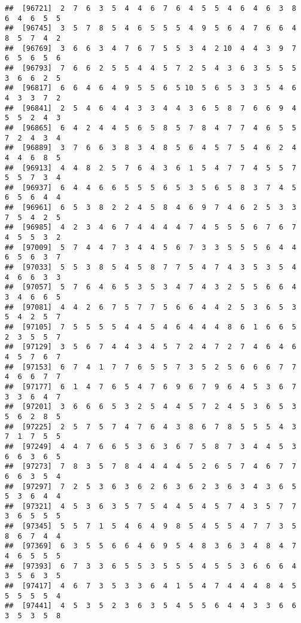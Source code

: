 \documentclass[
]{book}
\begin{document}
\begin{verbatim}
##  [96721]  2  7  6  3  5  4  4  6  7  6  4  5  5  4  6  4  6  3  8  6  4  6  5  5
##  [96745]  3  5  7  8  5  4  6  5  5  5  4  9  5  6  4  7  6  6  4  8  5  7  4  2
##  [96769]  3  6  6  3  4  7  6  7  5  5  3  4  2 10  4  4  3  9  7  6  5  6  5  6
##  [96793]  7  6  6  2  5  5  4  4  5  7  2  5  4  3  6  3  5  5  5  3  6  6  2  5
##  [96817]  6  6  4  6  4  9  5  5  6  5 10  5  6  5  3  3  5  4  6  4  3  3  7  2
##  [96841]  2  5  4  6  4  4  3  3  4  4  3  6  5  8  7  6  6  9  4  5  5  2  4  3
##  [96865]  6  4  2  4  4  5  6  5  8  5  7  8  4  7  7  4  6  5  5  7  2  4  3  4
##  [96889]  3  7  6  6  3  8  3  4  8  5  6  4  5  7  5  4  6  2  4  4  4  6  8  5
##  [96913]  4  4  8  2  5  7  6  4  3  6  1  5  4  7  7  4  5  5  7  5  5  7  3  4
##  [96937]  6  4  4  6  6  5  5  5  6  5  3  5  6  5  8  3  7  4  5  6  5  6  4  4
##  [96961]  6  5  3  8  2  2  4  5  8  4  6  9  7  4  6  2  5  3  3  7  5  4  2  5
##  [96985]  4  2  3  4  6  7  4  4  4  4  7  4  5  5  5  6  7  6  7  4  5  5  3  2
##  [97009]  5  7  4  4  7  3  4  4  5  6  7  3  3  5  5  5  6  4  4  6  5  6  3  7
##  [97033]  5  5  3  8  5  4  5  8  7  7  5  4  7  4  3  5  3  5  4  4  6  6  3  3
##  [97057]  5  7  6  4  6  5  3  5  3  4  7  4  3  2  5  5  6  6  4  3  4  6  6  5
##  [97081]  4  4  2  6  7  5  7  7  5  6  6  4  4  2  5  3  6  5  3  5  4  2  5  7
##  [97105]  7  5  5  5  5  4  4  5  4  6  4  4  4  8  6  1  6  6  5  2  3  5  5  7
##  [97129]  3  5  6  7  4  4  3  4  5  7  2  4  7  2  7  4  6  4  6  4  5  7  6  7
##  [97153]  6  7  4  1  7  7  6  5  5  7  3  5  2  5  6  6  6  7  7  4  6  6  7  7
##  [97177]  6  1  4  7  6  5  4  7  6  9  6  7  9  6  4  5  3  6  7  3  3  6  4  7
##  [97201]  3  6  6  6  5  3  2  5  4  4  5  7  2  4  5  3  6  5  3  5  6  2  8  5
##  [97225]  2  5  7  5  7  4  7  6  4  3  8  6  7  8  5  5  5  4  3  7  1  7  5  5
##  [97249]  4  4  7  6  6  5  3  6  3  6  7  5  8  7  3  4  4  5  3  6  6  3  6  5
##  [97273]  7  8  3  5  7  8  4  4  4  4  5  2  6  5  7  4  6  7  7  6  6  3  5  4
##  [97297]  7  2  5  3  6  3  6  2  6  3  6  2  3  6  3  4  3  6  5  5  3  6  4  4
##  [97321]  4  5  3  6  3  5  7  5  4  4  5  4  5  7  4  3  5  7  7  3  6  5  5  5
##  [97345]  5  5  7  1  5  4  6  4  9  8  5  4  5  5  4  7  7  3  5  8  6  7  4  4
##  [97369]  6  3  5  5  6  6  4  6  9  5  4  8  3  6  3  4  8  4  7  4  6  5  5  5
##  [97393]  6  7  3  3  6  5  5  3  5  5  5  4  5  5  3  6  6  6  4  3  5  6  3  5
##  [97417]  4  6  7  3  5  3  3  6  4  1  5  4  7  4  4  4  8  4  5  5  5  5  5  4
##  [97441]  4  5  3  5  2  3  6  3  5  4  5  5  6  4  4  3  3  6  6  3  5  3  5  8

\end{verbatim}
\end{document}
